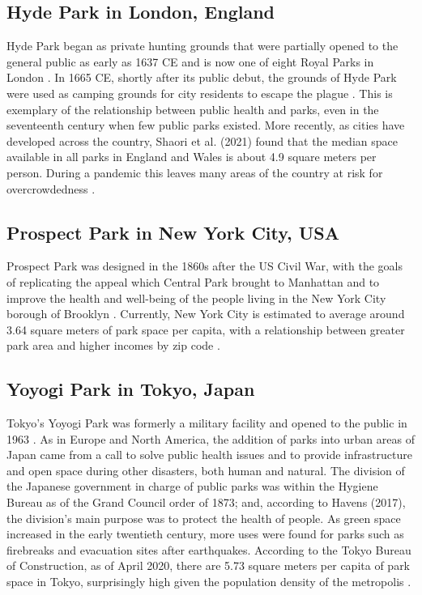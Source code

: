 \begin{multicols}{2}

\subsection{Hyde Park in London, England}
Hyde Park began as private hunting grounds that were partially opened to the general public as early as 1637 CE and is now one of eight Royal Parks in London \cite{noauthor_history_nodate}. In 1665 CE, shortly after its public debut, the grounds of Hyde Park were used as camping grounds for city residents to escape the plague \cite{noauthor_history_nodate}. This is exemplary of the relationship between public health and parks, even in the seventeenth century when few public parks existed. More recently, as cities have developed across the country, Shaori et al. (2021) found that the median space available in all parks in England and Wales is about 4.9 square meters per person. During a pandemic this leaves many areas of the country at risk for overcrowdedness \cite{shoari_accessibility_2020}.

\subsection{Prospect Park in New York City, USA}
Prospect Park was designed in the 1860s after the US Civil War, with the goals of replicating the appeal which Central Park brought to Manhattan and to improve the health and well-being of the people living in the New York City borough of Brooklyn \cite{tate_great_2013}. Currently, New York City is estimated to average around 3.64 square meters of park space per capita, with a relationship between greater park area and higher incomes by zip code \cite{noauthor_park_nodate}. 

\subsection{Yoyogi Park in Tokyo, Japan}
Tokyo's Yoyogi Park was formerly a military facility and opened to the public in 1963 \cite{havens_parkscapes_2011}. As in Europe and North America, the addition of parks into urban areas of Japan came from a call to solve public health issues and to provide infrastructure and open space during other disasters, both human and natural. The division of the Japanese government in charge of public parks was within the Hygiene Bureau as of the Grand Council order of 1873; and, according to Havens (2017), the division's main purpose was to protect the health of people. As green space increased in the early twentieth century, more uses were found for parks such as firebreaks and evacuation sites after earthquakes. According to the Tokyo Bureau of Construction, as of April 2020, there are 5.73 square meters per capita of park space in Tokyo, surprisingly high given the population density of the metropolis \cite{noauthor_parks_nodate}.


\end{multicols}
